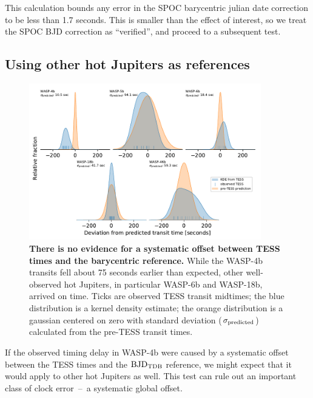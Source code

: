 \documentclass[12pt,twocolumn,tighten]{aastex62}
\begin{document}
This calculation bounds any error in the SPOC barycentric julian date
correction to be less than 1.7 seconds.  This is smaller than the
effect of interest, so we treat the SPOC BJD correction as
``verified'', and proceed to a subsequent test.


\subsection{Using other hot Jupiters as references}
\label{sec:hj_verification}

\begin{figure}[ht!]
  \begin{center}
    \leavevmode
    \includegraphics[width=0.9\textwidth]{f7.pdf}
  \end{center}
  \vspace{-0.5cm}
  \caption{
    {\bf There is no evidence for a systematic offset between TESS
    times and the barycentric reference.} While the WASP-4b transits
    fell about 75 seconds earlier than expected, other well-observed
    hot Jupiters, in particular WASP-6b and WASP-18b, arrived on time.
    Ticks are observed TESS transit midtimes; the blue distribution is
    a kernel density estimate; the orange distribution is a gaussian
    centered on zero with standard deviation ($\sigma_{\rm
    predicted}$) calculated from the pre-TESS transit times.
    \label{fig:hjs}
  }
\end{figure}

If the observed timing delay in WASP-4b were caused by a systematic
offset between the TESS times and the ${\rm
BJD}_{\rm TDB}$ reference, we might expect that it would apply to
other hot Jupiters as well.  This test can rule out an important class
of clock error~--~a systematic global offset.
\end{document}
